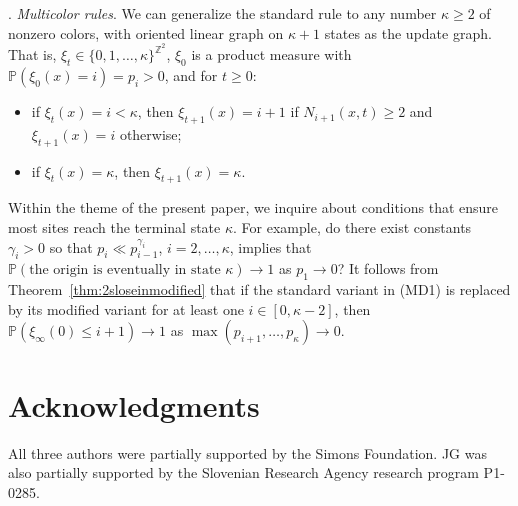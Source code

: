 \documentclass{article}
\renewcommand{\P}{\mathbb{P}}
\newcommand{\bZ}{{\mathbb Z}}
\numberwithin{equation}{section}
\newcommand{\note}[1]{{\bf \textcolor{blue}
{[#1\marginpar{\textcolor{red}{***}}]}}}
\begin{document}
 \bigskip
 
. {\it Multicolor rules\/}. We can generalize
the standard rule to any number $\kappa\ge 2$ of nonzero 
colors, with oriented linear graph on $\kappa+1$
states as the update graph. That is,  $\xi_t\in\{0,1,\ldots,\kappa\}^{\bZ^2}$, $\xi_0$ is a product measure with 
$\P(\xi_0(x)=i)=p_i>0$, and for $t\ge 0$: 
\begin{itemize}[leftmargin=1.25cm]
\item[(MD1)] if $\xi_t(x)=i<\kappa$, then $\xi_{t+1}(x)=i+1$ if $N_{i+1}(x,t)\ge 2$ and $\xi_{t+1}(x)=i$ otherwise;
\item[(MD2)] if $\xi_t(x)=\kappa$, then $\xi_{t+1}(x)=\kappa$.
\end{itemize}
Within the theme of the present paper, we inquire about conditions that 
ensure most sites reach the terminal state $\kappa$. For example, 
do there exist constants $\gamma_i>0$ so that $p_{i}\ll p_{i-1}^{\gamma_{i}}$,  $i=2,\ldots,\kappa$, implies that 
$\P(\text{the origin is eventually in state $\kappa$})\to 1$
as $p_1\to 0$? It follows from Theorem~\ref{thm:2sloseinmodified} that 
if the standard variant in (MD1) is replaced by its modified variant for at least one $i\in[0,\kappa-2]$, 
then
$\P(\xi_\infty(0)\le i+1)\to 1$ as $\max(p_{i+1},\ldots, p_\kappa)\to 0$. 








\section*{Acknowledgments} 
All three authors were partially supported by the Simons Foundation. JG was also partially supported by the Slovenian Research Agency research program P1-0285.





\end{document}
